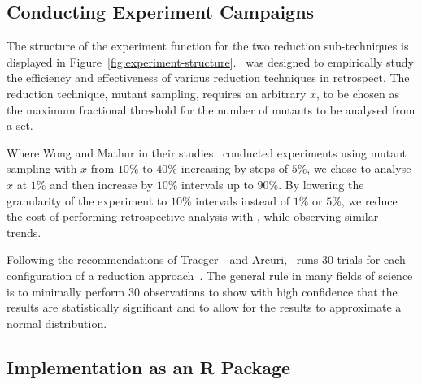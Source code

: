 \subsection{Conducting Experiment Campaigns}


The structure of the experiment function for the two reduction sub-techniques is displayed in
Figure~\ref{fig:experiment-structure}. \mr~was designed to empirically study the efficiency and effectiveness of various
reduction techniques in retrospect. The reduction technique, mutant sampling, requires an arbitrary $x$, to be chosen as
the maximum fractional threshold for the number of mutants to be analysed from a set.

Where Wong and Mathur in their studies~\cite{mathur1994empirical, wong1993mutation} conducted experiments using mutant
sampling with $x$ from $10\%$ to $40\%$ increasing by steps of $5\%$, we chose to analyse $x$ at $1\%$ and then increase
by $10\%$ intervals up to $90\%$. By lowering the granularity of the experiment to $10\%$ intervals instead of $1\%$ or
$5\%$, we reduce the cost of performing retrospective analysis with \mr, while observing similar trends.

Following the recommendations of Traeger~\etal~and Arcuri, \mr~runs 30 trials for each configuration of a reduction
approach~\cite{traeger2008nine, arcuri2014hitchhiker}. The general rule in many fields of science is to minimally
perform 30 observations to show with high confidence that the results are statistically significant and to allow for the
results to approximate a normal distribution.

\subsection{Implementation as an R Package}

